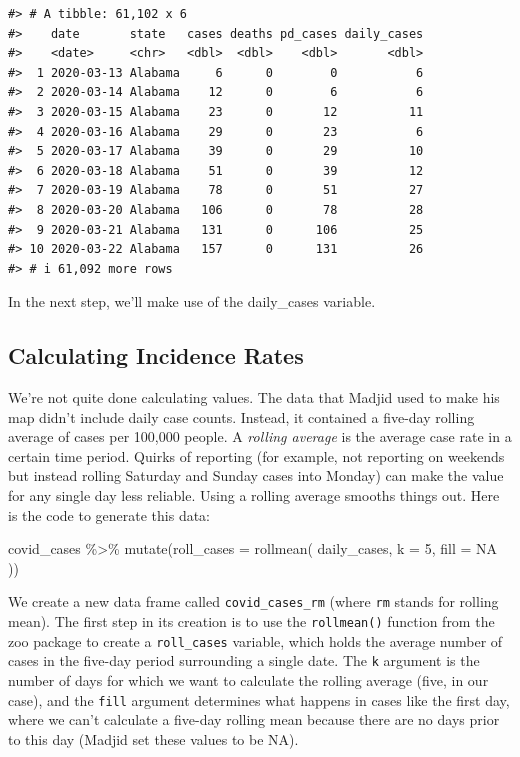 \documentclass[
]{book}
\newenvironment{Shaded}{\begin{snugshade}}{\end{snugshade}}
\newcommand{\AttributeTok}[1]{\textcolor[rgb]{0.77,0.63,0.00}{#1}}
\newcommand{\ConstantTok}[1]{\textcolor[rgb]{0.00,0.00,0.00}{#1}}
\newcommand{\DecValTok}[1]{\textcolor[rgb]{0.00,0.00,0.81}{#1}}
\newcommand{\FunctionTok}[1]{\textcolor[rgb]{0.00,0.00,0.00}{#1}}
\newcommand{\NormalTok}[1]{#1}
\newcommand{\SpecialCharTok}[1]{\textcolor[rgb]{0.00,0.00,0.00}{#1}}
\begin{document}
\begin{verbatim}
#> # A tibble: 61,102 x 6
#>    date       state   cases deaths pd_cases daily_cases
#>    <date>     <chr>   <dbl>  <dbl>    <dbl>       <dbl>
#>  1 2020-03-13 Alabama     6      0        0           6
#>  2 2020-03-14 Alabama    12      0        6           6
#>  3 2020-03-15 Alabama    23      0       12          11
#>  4 2020-03-16 Alabama    29      0       23           6
#>  5 2020-03-17 Alabama    39      0       29          10
#>  6 2020-03-18 Alabama    51      0       39          12
#>  7 2020-03-19 Alabama    78      0       51          27
#>  8 2020-03-20 Alabama   106      0       78          28
#>  9 2020-03-21 Alabama   131      0      106          25
#> 10 2020-03-22 Alabama   157      0      131          26
#> # i 61,092 more rows
\end{verbatim}

In the next step, we'll make use of the daily\_cases variable.

\hypertarget{calculating-incidence-rates}{%
\subsection*{Calculating Incidence Rates}\label{calculating-incidence-rates}}

We're not quite done calculating values. The data that Madjid used to make his map didn't include daily case counts. Instead, it contained a five-day rolling average of cases per 100,000 people. A \emph{rolling average} is the average case rate in a certain time period. Quirks of reporting (for example, not reporting on weekends but instead rolling Saturday and Sunday cases into Monday) can make the value for any single day less reliable. Using a rolling average smooths things out. Here is the code to generate this data:

\begin{Shaded}
\begin{Highlighting}[]
\NormalTok{covid\_cases }\SpecialCharTok{\%\textgreater{}\%}
  \FunctionTok{mutate}\NormalTok{(}\AttributeTok{roll\_cases =} \FunctionTok{rollmean}\NormalTok{(}
\NormalTok{    daily\_cases,}
    \AttributeTok{k =} \DecValTok{5}\NormalTok{,}
    \AttributeTok{fill =} \ConstantTok{NA}
\NormalTok{  ))}
\end{Highlighting}
\end{Shaded}

We create a new data frame called \texttt{covid\_cases\_rm} (where \texttt{rm} stands for rolling mean). The first step in its creation is to use the \texttt{rollmean()} function from the zoo package to create a \texttt{roll\_cases} variable, which holds the average number of cases in the five-day period surrounding a single date. The \texttt{k} argument is the number of days for which we want to calculate the rolling average (five, in our case), and the \texttt{fill} argument determines what happens in cases like the first day, where we can't calculate a five-day rolling mean because there are no days prior to this day (Madjid set these values to be NA).
\end{document}
